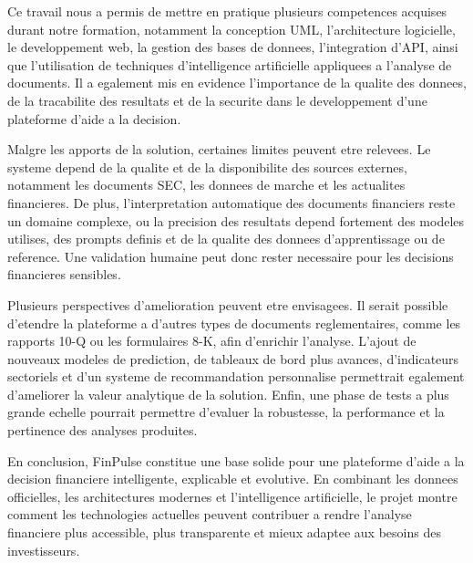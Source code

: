 Ce travail nous a permis de mettre en pratique plusieurs competences acquises durant
notre formation, notamment la conception UML, l'architecture logicielle, le
developpement web, la gestion des bases de donnees, l'integration d'API, ainsi que
l'utilisation de techniques d'intelligence artificielle appliquees a l'analyse de
documents. Il a egalement mis en evidence l'importance de la qualite des donnees, de
la tracabilite des resultats et de la securite dans le developpement d'une plateforme
d'aide a la decision.

Malgre les apports de la solution, certaines limites peuvent etre relevees. Le systeme
depend de la qualite et de la disponibilite des sources externes, notamment les
documents SEC, les donnees de marche et les actualites financieres. De plus,
l'interpretation automatique des documents financiers reste un domaine complexe, ou la
precision des resultats depend fortement des modeles utilises, des prompts definis et
de la qualite des donnees d'apprentissage ou de reference. Une validation humaine peut
donc rester necessaire pour les decisions financieres sensibles.

Plusieurs perspectives d'amelioration peuvent etre envisagees. Il serait possible
d'etendre la plateforme a d'autres types de documents reglementaires, comme les
rapports 10-Q ou les formulaires 8-K, afin d'enrichir l'analyse. L'ajout de nouveaux
modeles de prediction, de tableaux de bord plus avances, d'indicateurs sectoriels et
d'un systeme de recommandation personnalise permettrait egalement d'ameliorer la
valeur analytique de la solution. Enfin, une phase de tests a plus grande echelle
pourrait permettre d'evaluer la robustesse, la performance et la pertinence des
analyses produites.

En conclusion, FinPulse constitue une base solide pour une plateforme d'aide a la
decision financiere intelligente, explicable et evolutive. En combinant les donnees
officielles, les architectures modernes et l'intelligence artificielle, le projet
montre comment les technologies actuelles peuvent contribuer a rendre l'analyse
financiere plus accessible, plus transparente et mieux adaptee aux besoins des
investisseurs.
